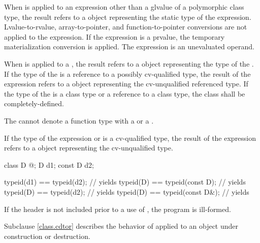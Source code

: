 \pnum
When  is applied to an expression other than a glvalue of
a polymorphic class type, the result refers to a 
object representing the static type of the expression.
Lvalue-to-rvalue, array-to-pointer,
and function-to-pointer conversions are not applied to
the expression.
If the expression is a prvalue,
the temporary materialization conversion
is applied.
The expression is an unevaluated operand.

\pnum
When  is applied to a , the result
refers to a  object representing the type of the
. If the type of the  is a reference
to a possibly cv-qualified type, the result of the
 expression refers to a  object
representing the cv-unqualified referenced type. If the type of
the  is a class type or a reference to a class type,
the class shall be completely-defined.
\begin{note}
The  cannot denote a function type with
a  or a .
\end{note}

\pnum
If the type of the expression or  is a
cv-qualified type, the result of the  expression refers
to a  object representing the cv-unqualified
type.
\begin{example}
\begin{codeblock}
class D { @\commentellip@ };
D d1;
const D d2;

typeid(d1) == typeid(d2);       // yields 
typeid(D)  == typeid(const D);  // yields 
typeid(D)  == typeid(d2);       // yields 
typeid(D)  == typeid(const D&); // yields 
\end{codeblock}
\end{example}

\pnum
If the header  is not included prior
to a use of , the program is ill-formed.

\pnum
\begin{note}
Subclause \ref{class.cdtor} describes the behavior of 
applied to an object under construction or destruction.
\end{note}

